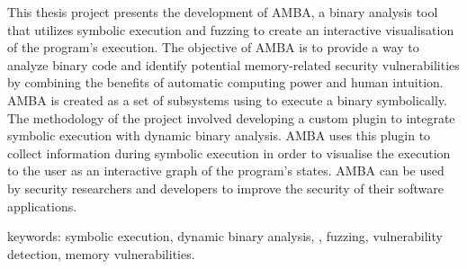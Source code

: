 
This thesis project presents the development of AMBA, a binary analysis 
tool that utilizes symbolic execution and fuzzing to create an interactive 
visualisation of the program's execution. The objective of AMBA is to provide 
a way to analyze binary code and identify potential memory-related security 
vulnerabilities by combining the benefits of automatic computing power and 
human intuition. AMBA is created as a set of subsystems using \stoe{} to 
execute a binary symbolically. The methodology of the project involved 
developing a custom \stoe{} plugin to integrate symbolic execution with 
dynamic binary analysis. AMBA uses this plugin to collect information during 
symbolic execution in order to visualise the execution to the user as an 
interactive graph of the program's states. AMBA can be used by security 
researchers and developers to improve the security of their software 
applications.


keywords: symbolic execution, dynamic binary analysis, \stoe{}, 
fuzzing, vulnerability detection, memory vulnerabilities. 